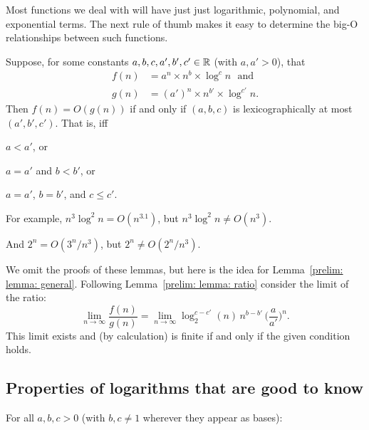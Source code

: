 \documentclass[11pt]{article}
\begin{document}
\continued

Most functions we deal with will have just just logarithmic, polynomial, and exponential terms.
The next rule of thumb makes it easy to determine the big-O relationships between such functions.

\begin{lemma}\label{prelim: lemma: general}
Suppose, for some constants $a, b, c, a', b', c' \in\mathbb{R}$ (with $a,a'>0$), that
\begin{align*}
  f(n) &{} = a^n \times n^b \times \log^c n \text{~~and~} \\
  g(n)&{} =  (a')^n \times n^{b'} \times \log^{c'} n.
\end{align*}
Then $f(n) = O(g(n))$ if and only if $(a, b, c)$ is lexicographically at most $(a', b', c')$.  That is, iff
\begin{mylist}[$\bullet$]
\item $a < a'$, or
\item $a = a'$ and $b < b'$, or
\item $a = a'$, $b = b'$, and $c \le c'$.
\end{mylist}
\end{lemma}

For example, $n^3\log^2 n = O(n^{3.1})$, but $n^3\log^2 n \ne O(n^{3})$.

And $2^n = O(3^n/n^3)$, but $2^n \ne O(2^n / n^3)$.

We omit the proofs of these lemmas, but here is the idea for Lemma~\ref{prelim: lemma: general}.
Following Lemma~\ref{prelim: lemma: ratio} consider the limit of the ratio:
\[
  \lim_{n\rightarrow\infty} \frac{f(n)}{g(n)}
  =
  \lim_{n\rightarrow\infty} \log^{c-c'}_2(n)\, n^{b-b'}\, \Big(\frac{a}{a'}\Big)^n.
\]
This limit exists and (by calculation) is finite if and only if the given condition holds.

\subsection{Properties of logarithms that are good to know}\label{prelim: sec: logarithms}

For all $a, b, c > 0$ (with $b, c \ne 1$ wherever they appear as bases):
\end{document}
